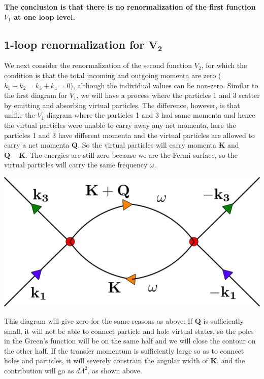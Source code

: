 \documentclass[14pt]{extarticle}
\begin{document}
\textbf{The conclusion is that there is no renormalization of the first function \(V_1\) at one loop level.}
\subsection{1-loop renormalization for \(\mathbf{V_2}\)}
We next consider the renormalization of the second function \(V_2\), for which the condition is that the total incoming and outgoing momenta are zero (\(k_1 + k_2 = k_3 + k_4 = 0\)), although the individual values can be non-zero. Similar to the first diagram for \(V_1\), we will have a process where the particles 1 and 3 scatter by emitting and absorbing virtual particles. The difference, however, is that unlike the \(V_1\) diagram where the particles 1 and 3 had same momenta and hence the virtual particles were unable to carry away any net momenta, here the particles 1 and 3 have different momenta and the virtual particles are allowed to carry a net momenta \(\mathbf{Q}\). So the virtual particles will carry momenta \(\mathbf{K}\) and \(\mathbf{Q-K}\). The energies are still zero because we are the Fermi surface, so the virtual particles will carry the same frequency \(\omega\). 
\begin{center}
\includegraphics[scale=0.3]{./figures/term7.png}
\label{bcs2}
\end{center}
This diagram will give zero for the same reasons as above: If \(\mathbf{Q}\) is sufficiently small, it will not be able to connect particle and hole virtual states, so the poles in the Green's function will be on the same half and we will close the contour on the other half. If the transfer momentum is sufficiently large so as to connect holes and particles, it will severely constrain the angular width of \(\mathbf{K}\), and the contribution will go as \(d\Lambda^2\), as shown above.
 
\end{document}
